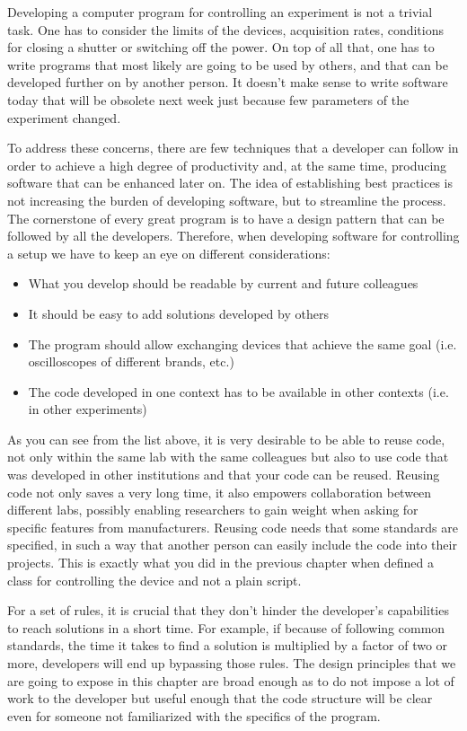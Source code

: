Developing a computer program for controlling an experiment is not a
trivial task. One has to consider the limits of the devices, acquisition
rates, conditions for closing a shutter or switching off the power. On
top of all that, one has to write programs that most likely are going to
be used by others, and that can be developed further on by another
person. It doesn't make sense to write software today that will be
obsolete next week just because few parameters of the
experiment changed.

To address these concerns, there are few techniques that a developer can
follow in order to achieve a high degree of productivity and, at the
same time, producing software that can be enhanced later on. The idea of
establishing best practices is not increasing the burden of developing
software, but to streamline the process. The cornerstone of every great
program is to have a design pattern that can be followed by all the
developers. Therefore, when developing software for controlling a setup
we have to keep an eye on different considerations:

\begin{itemize}
\item
  What you develop should be readable by current and future colleagues
\item
  It should be easy to add solutions developed by others
\item
  The program should allow exchanging devices that achieve the same goal
  (i.e. oscilloscopes of different brands, etc.)
\item
  The code developed in one context has to be available in other
  contexts (i.e. in other experiments)
\end{itemize}

As you can see from the list above, it is very desirable to be able to
reuse code, not only within the same lab with the same colleagues but
also to use code that was developed in other institutions and that your
code can be reused. Reusing code not only saves a very long time, it
also empowers collaboration between different labs, possibly enabling
researchers to gain weight when asking for specific features from
manufacturers. Reusing code needs that some standards are specified, in
such a way that another person can easily include the code into their
projects. This is exactly what you did in the previous chapter when
defined a class for controlling the device and not a plain script.

For a set of rules, it is crucial that they don't hinder the developer's
capabilities to reach solutions in a short time. For example, if because
of following common standards, the time it takes to find a solution is
multiplied by a factor of two or more, developers will end up bypassing
those rules. The design principles that we are going to expose in this
chapter are broad enough as to do not impose a lot of work to the
developer but useful enough that the code structure will be clear even
for someone not familiarized with the specifics of the program.

